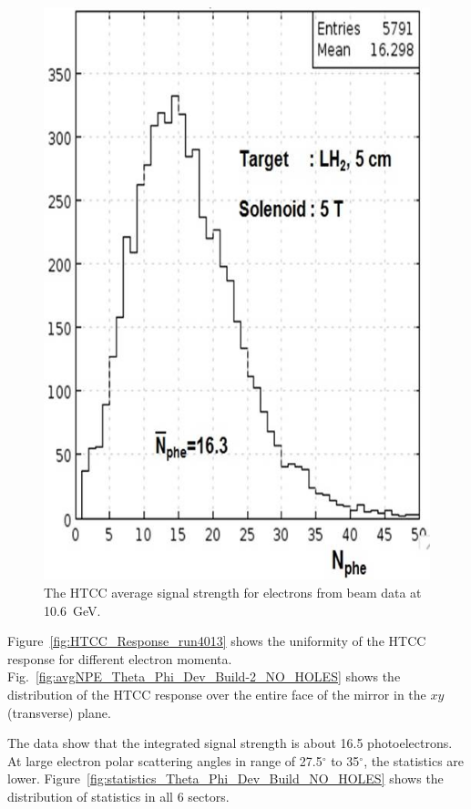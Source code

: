 \begin{figure}[!ht]
    \centering
    \includegraphics[width=1.0\linewidth,trim={0.0cm 0.0cm 0.0cm 0.0cm},clip]{images/Average_HTCC_Signal.jpg}
    \caption{The HTCC average signal strength for electrons from beam data at 10.6~GeV.}
    \label{fig:Average_HTCC_Signal}
\end{figure}

Figure~\ref{fig:HTCC_Response_run4013} shows the uniformity of the HTCC response for different electron
momenta. Fig.~\ref{fig:avgNPE_Theta_Phi_Dev_Build-2_NO_HOLES}  shows the distribution of the HTCC response
over the entire face of the mirror in the $xy$ (transverse) plane. 

The data show that the integrated signal strength is about 16.5 photoelectrons. At large electron polar scattering
angles in range of 27.5$^\circ$ to 35$^\circ$, the statistics are lower.
Figure~\ref{fig:statistics_Theta_Phi_Dev_Build_NO_HOLES} shows the distribution of statistics in all 6 sectors. 

